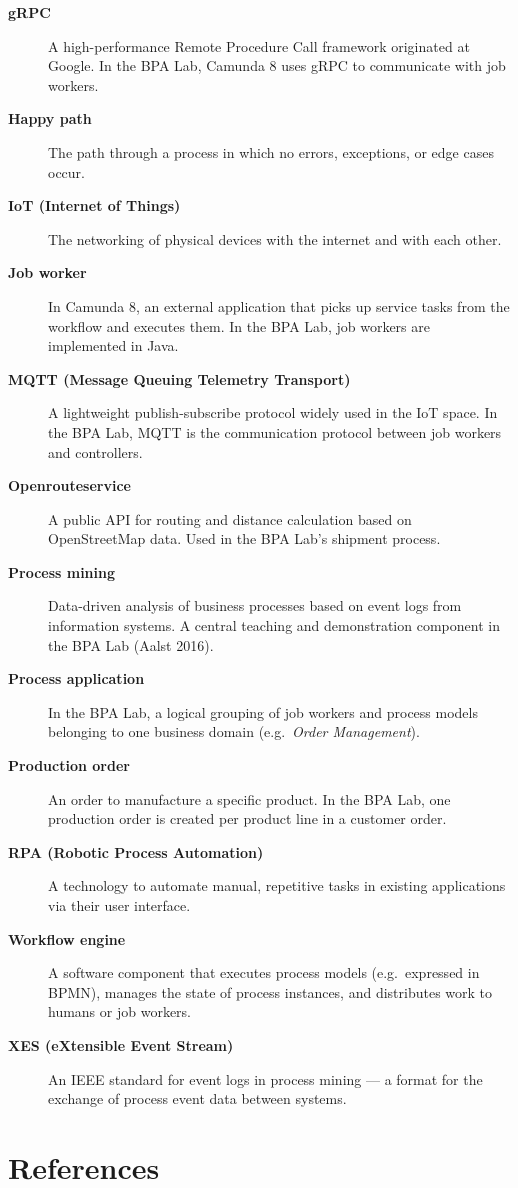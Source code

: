 \documentclass[
  english,
  11pt,
  a4paper,
]{scrbook}
\begin{document}
\begin{description}
\item[\textbf{gRPC}]
A high-performance Remote Procedure Call framework originated at Google.
In the BPA Lab, Camunda 8 uses gRPC to communicate with job workers.
\item[\textbf{Happy path}]
The path through a process in which no errors, exceptions, or edge cases
occur.
\item[\textbf{IoT (Internet of Things)}]
The networking of physical devices with the internet and with each
other.
\item[\textbf{Job worker}]
In Camunda 8, an external application that picks up service tasks from
the workflow and executes them. In the BPA Lab, job workers are
implemented in Java.
\item[\textbf{MQTT (Message Queuing Telemetry Transport)}]
A lightweight publish-subscribe protocol widely used in the IoT space.
In the BPA Lab, MQTT is the communication protocol between job workers
and controllers.
\item[\textbf{Openrouteservice}]
A public API for routing and distance calculation based on OpenStreetMap
data. Used in the BPA Lab's shipment process.
\item[\textbf{Process mining}]
Data-driven analysis of business processes based on event logs from
information systems. A central teaching and demonstration component in
the BPA Lab (Aalst 2016).
\item[\textbf{Process application}]
In the BPA Lab, a logical grouping of job workers and process models
belonging to one business domain (e.g.~\emph{Order Management}).
\item[\textbf{Production order}]
An order to manufacture a specific product. In the BPA Lab, one
production order is created per product line in a customer order.
\item[\textbf{RPA (Robotic Process Automation)}]
A technology to automate manual, repetitive tasks in existing
applications via their user interface.
\item[\textbf{Workflow engine}]
A software component that executes process models (e.g.~expressed in
BPMN), manages the state of process instances, and distributes work to
humans or job workers.
\item[\textbf{XES (eXtensible Event Stream)}]
An IEEE standard for event logs in process mining --- a format for the
exchange of process event data between systems.
\end{description}

\chapter{References}\label{references}
\end{document}
